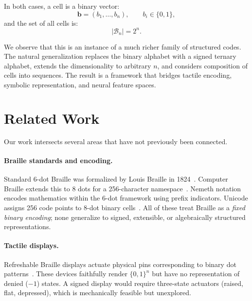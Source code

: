 \documentclass[11pt,a4paper]{article}
\newcommand{\B}{\mathcal{B}}
\newcommand{\bvec}{\bm{b}}
\begin{document}
In both cases, a cell is a binary vector:
\begin{equation}
  \bvec = (b_1, \ldots, b_n), \qquad b_i \in \{0,1\},
\end{equation}
and the set of all cells is:
\begin{equation}
  |\B_n| = 2^n.
\end{equation}

We observe that this is an instance of a much richer family of
structured codes.
The natural generalization replaces the binary alphabet with a
signed ternary alphabet, extends the dimensionality to arbitrary $n$,
and considers composition of cells into sequences.
The result is a framework that bridges tactile encoding,
symbolic representation, and neural feature spaces.

\section{Related Work}
\label{sec:related}

Our work intersects several areas that have not previously been
connected.

\paragraph{Braille standards and encoding.}
Standard 6-dot Braille was formalized by Louis Braille in
1824~\cite{koenig1969reading}.
Computer Braille extends this to 8 dots for a 256-character
namespace~\cite{ueb2013}.
Nemeth notation~\cite{nemeth1972} encodes mathematics
within the 6-dot framework using prefix indicators.
Unicode assigns 256 code points to 8-dot binary
cells~\cite{unicode_braille}.
All of these treat Braille as a \emph{fixed binary encoding};
none generalize to signed, extensible, or algebraically structured
representations.

\paragraph{Tactile displays.}
Refreshable Braille displays actuate physical pins corresponding
to binary dot patterns~\cite{vidal2020refreshable,
russomanno2015refreshable}.
These devices faithfully render $\{0,1\}^n$ but have no
representation of denied ($-1$) states.
A signed display would require three-state actuators
(raised, flat, depressed), which is mechanically feasible but
unexplored.
\end{document}
